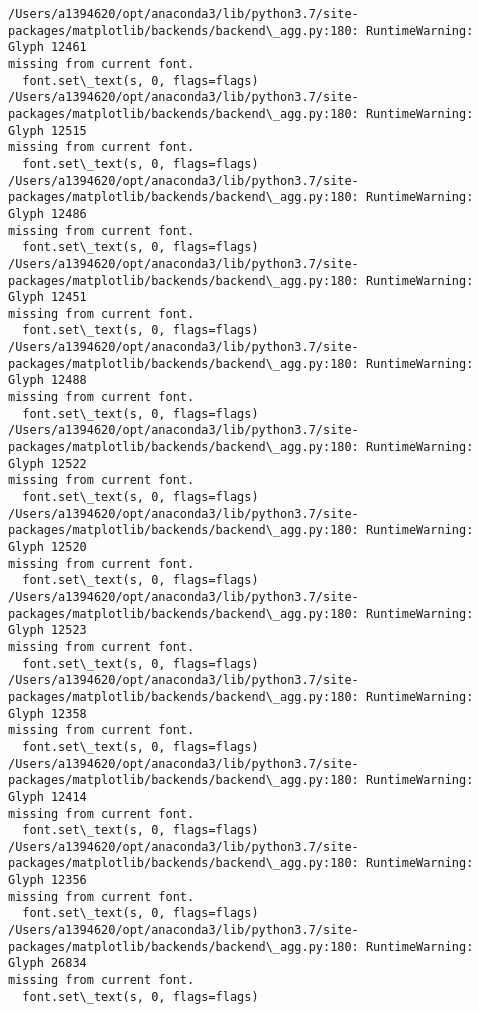 \documentclass[11pt]{article}
\begin{document}
\begin{Verbatim}[commandchars=\\\{\}]
/Users/a1394620/opt/anaconda3/lib/python3.7/site-
packages/matplotlib/backends/backend\_agg.py:180: RuntimeWarning: Glyph 12461
missing from current font.
  font.set\_text(s, 0, flags=flags)
/Users/a1394620/opt/anaconda3/lib/python3.7/site-
packages/matplotlib/backends/backend\_agg.py:180: RuntimeWarning: Glyph 12515
missing from current font.
  font.set\_text(s, 0, flags=flags)
/Users/a1394620/opt/anaconda3/lib/python3.7/site-
packages/matplotlib/backends/backend\_agg.py:180: RuntimeWarning: Glyph 12486
missing from current font.
  font.set\_text(s, 0, flags=flags)
/Users/a1394620/opt/anaconda3/lib/python3.7/site-
packages/matplotlib/backends/backend\_agg.py:180: RuntimeWarning: Glyph 12451
missing from current font.
  font.set\_text(s, 0, flags=flags)
/Users/a1394620/opt/anaconda3/lib/python3.7/site-
packages/matplotlib/backends/backend\_agg.py:180: RuntimeWarning: Glyph 12488
missing from current font.
  font.set\_text(s, 0, flags=flags)
/Users/a1394620/opt/anaconda3/lib/python3.7/site-
packages/matplotlib/backends/backend\_agg.py:180: RuntimeWarning: Glyph 12522
missing from current font.
  font.set\_text(s, 0, flags=flags)
/Users/a1394620/opt/anaconda3/lib/python3.7/site-
packages/matplotlib/backends/backend\_agg.py:180: RuntimeWarning: Glyph 12520
missing from current font.
  font.set\_text(s, 0, flags=flags)
/Users/a1394620/opt/anaconda3/lib/python3.7/site-
packages/matplotlib/backends/backend\_agg.py:180: RuntimeWarning: Glyph 12523
missing from current font.
  font.set\_text(s, 0, flags=flags)
/Users/a1394620/opt/anaconda3/lib/python3.7/site-
packages/matplotlib/backends/backend\_agg.py:180: RuntimeWarning: Glyph 12358
missing from current font.
  font.set\_text(s, 0, flags=flags)
/Users/a1394620/opt/anaconda3/lib/python3.7/site-
packages/matplotlib/backends/backend\_agg.py:180: RuntimeWarning: Glyph 12414
missing from current font.
  font.set\_text(s, 0, flags=flags)
/Users/a1394620/opt/anaconda3/lib/python3.7/site-
packages/matplotlib/backends/backend\_agg.py:180: RuntimeWarning: Glyph 12356
missing from current font.
  font.set\_text(s, 0, flags=flags)
/Users/a1394620/opt/anaconda3/lib/python3.7/site-
packages/matplotlib/backends/backend\_agg.py:180: RuntimeWarning: Glyph 26834
missing from current font.
  font.set\_text(s, 0, flags=flags)
    \end{Verbatim}

    \begin{center}
    \end{center}
    { \hspace*{\fill} \\}
    
\end{document}
